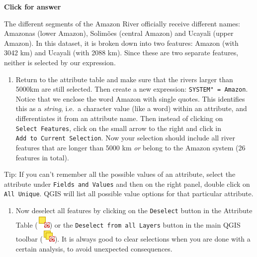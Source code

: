 \documentclass[
  letterpaper,
  DIV=11,
  numbers=noendperiod]{scrreprt}
\providecommand{\tightlist}{%
  \setlength{\itemsep}{0pt}\setlength{\parskip}{0pt}}\usepackage{longtable,booktabs,array}
\begin{document}
\begin{tcolorbox}[enhanced jigsaw, toprule=.15mm, breakable, left=2mm, colframe=quarto-callout-important-color-frame, colback=white, arc=.35mm, leftrule=.75mm, opacityback=0, rightrule=.15mm, bottomrule=.15mm]

\vspace{-3mm}\textbf{Click for answer}\vspace{3mm}

The different segments of the Amazon River officially receive different
names: Amazonas (lower Amazon), Solimões (central Amazon) and Ucayali
(upper Amazon). In this dataset, it is broken down into two features:
Amazon (with 3042 km) and Ucayali (with 2088 km). Since these are two
separate features, neither is selected by our expression.

\end{tcolorbox}

\begin{enumerate}
\def\labelenumi{(\arabic{enumi})}
\setcounter{enumi}{82}
\tightlist
\item
  Return to the attribute table and make sure that the rivers larger
  than 5000km are still selected. Then create a new expression:
  \texttt{SYSTEM"\ =\ \textquotesingle{}Amazon\textquotesingle{}}.
  Notice that we enclose the word Amazon with single quotes. This
  identifies this as a \emph{string}, i.e.~a character value (like a
  word) within an attribute, and differentiates it from an attribute
  name. Then instead of clicking on \texttt{Select\ Features}, click on
  the small arrow to the right and click in
  \texttt{Add\ to\ Current\ Selection}. Now your selection should
  include all river features that are longer than 5000 km \emph{or}
  belong to the Amazon system (26 features in total).
\end{enumerate}

Tip: If you can't remember all the possible values of an attribute,
select the attribute under \texttt{Fields\ and\ Values} and then on the
right panel, double click on \texttt{All\ Unique}. QGIS will list all
possible value options for that particular attribute.

\begin{enumerate}
\def\labelenumi{(\arabic{enumi})}
\setcounter{enumi}{83}
\tightlist
\item
  Now deselect all features by clicking on the \texttt{Deselect} button
  in the Attribute Table
  (\includegraphics{index_files/mediabag/mActionDeselectActiv.png}) or
  the \texttt{Deselect\ from\ all\ Layers} button in the main QGIS
  toolbar
  (\includegraphics{index_files/mediabag/mActionDeselectAll.png}). It is
  always good to clear selections when you are done with a certain
  analysis, to avoid unexpected consequences.
\end{enumerate}
\end{document}
